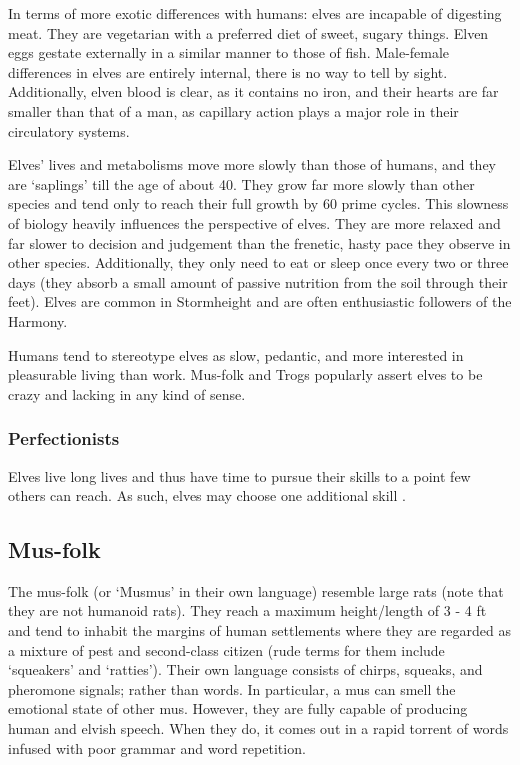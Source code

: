 \documentclass[a4paper,11pt,oneside]{book}
\newcommand{\textlf}[1]{\textbf{\titlecap{#1}}}
\begin{document}
In terms of more exotic differences with humans: elves are incapable of digesting meat. They are vegetarian with a preferred diet of sweet, sugary things. Elven eggs gestate externally in a similar manner to those of fish. Male-female differences in elves are entirely internal, there is no way to tell by sight. Additionally, elven blood is clear, as it contains no iron, and their hearts are far smaller than that of a man, as capillary action plays a major role in their circulatory systems.

Elves' lives and metabolisms move more slowly than those of humans, and they are `saplings' till the age of about 40. They grow far more slowly than other species and tend only to reach their full growth by 60 prime cycles. This slowness of biology heavily influences the perspective of elves. They are more relaxed and far slower to decision and judgement than the frenetic, hasty pace they observe in other species. Additionally, they only need to eat or sleep once every two or three days (they absorb a small amount of passive nutrition from the soil through their feet). Elves are common in Stormheight and are often enthusiastic followers of the Harmony. 

Humans tend to stereotype elves as slow, pedantic, and more interested in pleasurable living than work. Mus-folk and Trogs popularly assert elves to be crazy and lacking in any kind of sense. 

\subsubsection*{Perfectionists}
Elves live long lives and thus have time to pursue their skills to a point few others can reach. As such, elves may choose one additional skill \textlf{proficiency}.


\subsection{Mus-folk}
The mus-folk (or `Musmus' in their own language) resemble large rats (note that they are not humanoid rats). They reach a maximum height/length of 3 - 4 ft and tend to inhabit the margins of human settlements where they are regarded as a mixture of pest and second-class citizen (rude terms for them include `squeakers' and `ratties'). Their own language consists of chirps, squeaks, and pheromone signals; rather than words. In particular, a mus can smell the emotional state of other mus. However, they are fully capable of producing human and elvish speech. When they do, it comes out in a rapid torrent of words infused with poor grammar and word repetition. 
\end{document}
